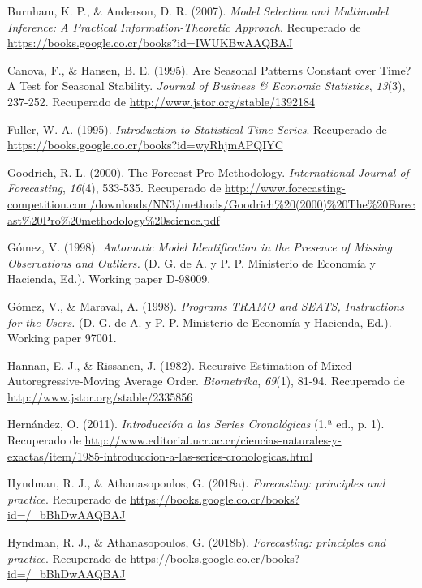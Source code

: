 \documentclass[
]{article}
\begin{document}
\leavevmode\hypertarget{ref-burnham2007model}{}%
Burnham, K. P., \& Anderson, D. R. (2007). \emph{Model Selection and
Multimodel Inference: A Practical Information-Theoretic Approach}.
Recuperado de \url{https://books.google.co.cr/books?id=IWUKBwAAQBAJ}

\leavevmode\hypertarget{ref-10.2307ux2f1392184}{}%
Canova, F., \& Hansen, B. E. (1995). Are Seasonal Patterns Constant over
Time? A Test for Seasonal Stability. \emph{Journal of Business \&
Economic Statistics}, \emph{13}(3), 237-252. Recuperado de
\url{http://www.jstor.org/stable/1392184}

\leavevmode\hypertarget{ref-fuller1995introduction}{}%
Fuller, W. A. (1995). \emph{Introduction to Statistical Time Series}.
Recuperado de \url{https://books.google.co.cr/books?id=wyRhjmAPQIYC}

\leavevmode\hypertarget{ref-forecastpro}{}%
Goodrich, R. L. (2000). The Forecast Pro Methodology.
\emph{International Journal of Forecasting}, \emph{16}(4), 533-535.
Recuperado de
\url{http://www.forecasting-competition.com/downloads/NN3/methods/Goodrich\%20(2000)\%20The\%20Forecast\%20Pro\%20methodology\%20science.pdf}

\leavevmode\hypertarget{ref-gomez}{}%
Gómez, V. (1998). \emph{Automatic Model Identification in the Presence
of Missing Observations and Outliers.} (D. G. de A. y P. P. Ministerio
de Economía y Hacienda, Ed.). Working paper D-98009.

\leavevmode\hypertarget{ref-tramo}{}%
Gómez, V., \& Maraval, A. (1998). \emph{Programs TRAMO and SEATS,
Instructions for the Users.} (D. G. de A. y P. P. Ministerio de Economía
y Hacienda, Ed.). Working paper 97001.

\leavevmode\hypertarget{ref-hannan}{}%
Hannan, E. J., \& Rissanen, J. (1982). Recursive Estimation of Mixed
Autoregressive-Moving Average Order. \emph{Biometrika}, \emph{69}(1),
81-94. Recuperado de \url{http://www.jstor.org/stable/2335856}

\leavevmode\hypertarget{ref-oscarh-1}{}%
Hernández, O. (2011). \emph{Introducción a las Series Cronológicas} (1.ª
ed., p. 1). Recuperado de
\url{http://www.editorial.ucr.ac.cr/ciencias-naturales-y-exactas/item/1985-introduccion-a-las-series-cronologicas.html}

\leavevmode\hypertarget{ref-hyndman2018forecasting}{}%
Hyndman, R. J., \& Athanasopoulos, G. (2018a). \emph{Forecasting:
principles and practice}. Recuperado de
\url{https://books.google.co.cr/books?id=/_bBhDwAAQBAJ}

\leavevmode\hypertarget{ref-hyndman_box-jenkins}{}%
Hyndman, R. J., \& Athanasopoulos, G. (2018b). \emph{Forecasting:
principles and practice}. Recuperado de
\url{https://books.google.co.cr/books?id=/_bBhDwAAQBAJ}
\end{document}
